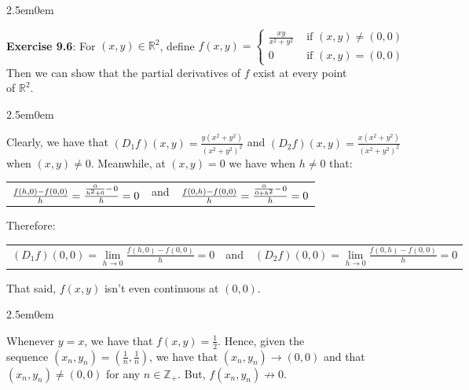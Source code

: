 \documentclass{book}
\newcommand{\exOne}{%
   \color{Purple}%
   \fontsize{14}{16}\selectfont%
}
\newcommand{\exTwo}{%
   \color{RedViolet}%
   \fontsize{13}{15}\selectfont%
}
\newenvironment{myIndent}{%
   \begin{adjustwidth}{2.5em}{0em}%
}{%
   \end{adjustwidth}%
}
\newcommand{\retTwo}{\hfill\bigbreak}
\begin{document}
{\begin{myIndent}\exOne
   \textbf{Exercise 9.6}: For $(x, y) \in \mathbb{R}^2$, define $f(x, y) = \left\{
   \begin{matrix}
      \frac{xy}{x^2 + y^2} & \text{ if } (x, y) \neq (0, 0) \\
      0 & \text{ if } (x, y) = (0, 0)
   \end{matrix}\right.$\\ [6pt]
   Then we can show that the partial derivatives of $f$ exist at every point\\ of $\mathbb{R}^2$.
   {\begin{myIndent}\exTwo
      Clearly, we have that $(D_1f)(x, y) = \frac{y(x^2 + y^2)}{(x^2 + y^2)^2}$ and $(D_2f)(x, y) = \frac{x(x^2 + y^2)}{(x^2 + y^2)^2}$\\ when $(x, y) \neq 0$. Meanwhile, at $(x, y) = 0$ we have when $h \neq 0$ that:
      {\begin{center}\fontsize{12}{14}\selectfont
         \begin{tabular}{c c c}
            $\frac{f(h, 0) - f(0, 0)}{h} = \frac{\frac{0}{h^2 + 0} -\hspace{0.1em} 0}{h} = 0$ & and & $\frac{f(0, h) - f(0, 0)}{h} = \frac{\frac{0}{0 + h^2} -\hspace{0.1em}0}{h} = 0$
         \end{tabular}\retTwo
      \end{center}}

      Therefore:\\ [-16pt]

      \begin{center}{\fontsize{11.7}{13}\selectfont
         \begin{tabular}{c c c}
            $(D_1f)(0, 0) = \lim\limits_{h\rightarrow 0}\frac{f(h, 0) - f(0, 0)}{h} = 0$ & and & $(D_2f)(0, 0) = \lim\limits_{h\rightarrow 0}\frac{f(0, h) - f(0, 0)}{h} = 0$
         \end{tabular}}\retTwo
      \end{center}
   \end{myIndent}}

   That said, $f(x, y)$ isn't even continuous at $(0, 0)$.
   {\begin{myIndent}\exTwo
      Whenever $y = x$, we have that $f(x, y) = \frac{1}{2}$. Hence, given the\\ sequence $(x_n, y_n) = (\frac{1}{n}, \frac{1}{n})$, we have that $(x_n, y_n) \rightarrow (0, 0)$ and that\\ $(x_n, y_n) \neq (0, 0)$ for any $n \in \mathbb{Z}_+$. But, $f(x_n, y_n) \not\rightarrow 0$.\retTwo
      

\end{myIndent}}
\end{myIndent}}
\end{document}

